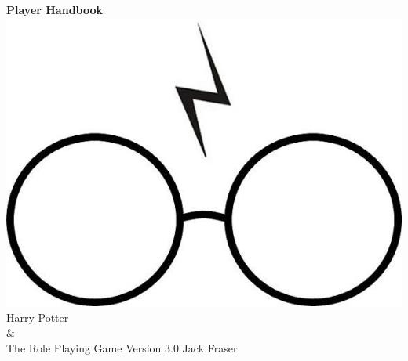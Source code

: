 \documentclass[oneside, twocolumn,9pt]{extbook}
\begin{document}
\begin{titlepage}
    \centering
    \vfill
    {\bfseries
        {\HP \fontsize{40}{35}\selectfont Player Handbook}
    }    
    \vfill
    \includegraphics[scale = 0.7]{../Images/glasses} %
    \vfill
    {\HP \fontsize{30}{24} \selectfont  Harry Potter \\\&\\ The Role Playing Game}
    \normalsize
    \vfill
    {\HP \fontsize{22}{0} \selectfont Version 3.0 \hfill Jack Fraser}
\end{titlepage}

\footnotesize
\tableofcontents
\normalsize

























\end{document}
